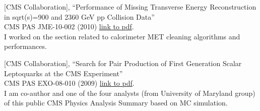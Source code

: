 \documentclass[10pt, a4paper]{article}
\begin{document}
\begin{thebibliography}{599}

[CMS Collaboration],
``Performance of Missing Transverse Energy Reconstruction in sqrt(s)=900 and 2360 GeV pp Collision Data''\\
  CMS PAS JME-10-002 (2010)
  \href{http://cdsweb.cern.ch/record/1247385/files/JME-10-002-pas.pdf}{link
  to pdf}.
  \\ I worked on the section related to calorimeter MET cleaning algorithms and performances.

[CMS Collaboration],
``Search for Pair Production of First Generation Scalar Leptoquarks at the CMS Experiment''\\
  CMS PAS EXO-08-010 (2009)
  \href{http://cdsweb.cern.ch/record/1196076/files/EXO-08-010-pas.pdf}{link
  to pdf}.
  \\I am co-author and one of the four analysts (from University of Maryland group) of this public CMS Physics Analysis Summary based on MC simulation.
  


\end{thebibliography}
\end{document}
